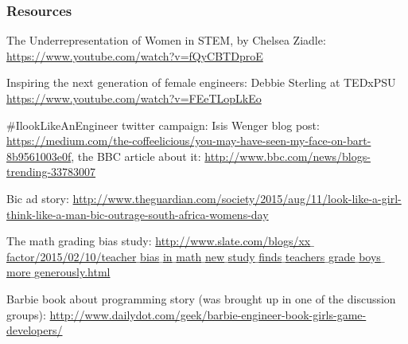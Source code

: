 \documentclass{beamer}
\begin{document}
\begin{frame}
\frametitle{Resources}
\begin{itemize}
{\tiny 
\item The Underrepresentation of Women in STEM, by Chelsea Ziadle: \href{https://www.youtube.com/watch?v=fQyCBTDproE}{https://www.youtube.com/watch?v=fQyCBTDproE}
\item Inspiring the next generation of female engineers: Debbie Sterling at TEDxPSU \href{https://www.youtube.com/watch?v=FEeTLopLkEo}{https://www.youtube.com/watch?v=FEeTLopLkEo}
\item \#IlookLikeAnEngineer twitter campaign:  Isis Wenger blog post: \href{https://medium.com/the-coffeelicious/you-may-have-seen-my-face-on-bart-8b9561003e0f}{https://medium.com/the-coffeelicious/you-may-have-seen-my-face-on-bart-8b9561003e0f}, the BBC article about it: \href{http://www.bbc.com/news/blogs-trending-33783007}{http://www.bbc.com/news/blogs-trending-33783007}
\item Bic ad story: \href{http://www.theguardian.com/society/2015/aug/11/look-like-a-girl-think-like-a-man-bic-outrage-south-africa-womens-day}{http://www.theguardian.com/society/2015/aug/11/look-like-a-girl-think-like-a-man-bic-outrage-south-africa-womens-day}
\item The math grading bias study: \href{http://www.slate.com/blogs/xx_factor/2015/02/10/teacher_bias_in_math_new_study_finds_teachers_grade_boys_more_generously.html}{http://www.slate.com/blogs/xx$\_$factor/2015/02/10/teacher$\_$bias$\_$in$\_$math$\_$new$\_$study$\_$finds$\_$teachers$\_$grade$\_$boys$\_$more$\_$generously.html}
\item Barbie book about programming story (was brought up in one of the discussion groups): \href{http://www.dailydot.com/geek/barbie-engineer-book-girls-game-developers/}{http://www.dailydot.com/geek/barbie-engineer-book-girls-game-developers/}
}
\end{itemize}
\end{frame}
\end{document}
